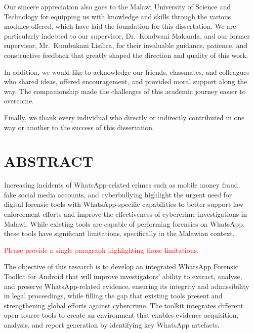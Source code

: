 \documentclass[12pt,a4paper]{report}
\begin{document}
Our sincere appreciation also goes to the Malawi University of Science and Technology for equipping us with knowledge and skills through the various modules offered, which have laid the foundation for this dissertation. We are particularly indebted to our supervisor, Dr.\ Kondwani Makanda, and our former supervisor, Mr.\ Kumbukani Lisilira, for their invaluable guidance, patience, and constructive feedback that greatly shaped the direction and quality of this work.

In addition, we would like to acknowledge our friends, classmates, and colleagues who shared ideas, offered encouragement, and provided moral support along the way. The companionship made the challenges of this academic journey easier to overcome.

Finally, we thank every individual who directly or indirectly contributed in one way or another to the success of this dissertation.

\newpage
\chapter*{ABSTRACT}

Increasing incidents of WhatsApp-related crimes such as mobile money fraud, fake social media accounts, and cyberbullying highlight the urgent need for digital forensic tools with WhatsApp-specific capabilities to better support law enforcement efforts and improve the effectiveness of cybercrime investigations in Malawi. While existing tools are capable of performing forensics on WhatsApp, these tools have significant limitations, specifically in the Malawian context. 

\textcolor{red}{Please provide a single paragraph highlighting those limitations.}

The objective of this research is to develop an integrated WhatsApp Forensic Toolkit for Android that will improve investigators' ability to extract, analyse, and preserve WhatsApp-related evidence, ensuring its integrity and admissibility in legal proceedings, while filling the gap that existing tools present and strengthening global efforts against cybercrime. The toolkit integrates different open-source tools to create an environment that enables evidence acquisition, analysis, and report generation by identifying key WhatsApp artefacts.
\end{document}
